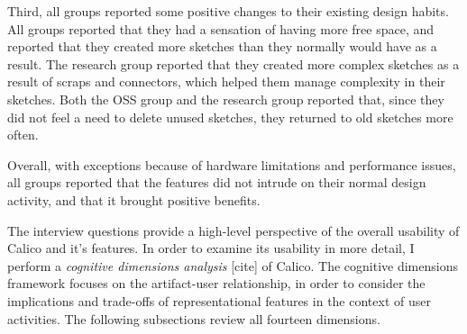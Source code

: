 
Third, all groups reported some positive changes to their existing design habits. All groups reported that they had a sensation of having more free space, and reported that they created more sketches than they normally would have as a result. The research group reported that they created more complex sketches as a result of scraps and connectors, which helped them manage complexity in their sketches. Both the OSS group and the research group reported that, since they did not feel a need to delete unused sketches, they returned to old sketches more often.



Overall, with exceptions because of hardware limitations and performance issues, all groups reported that the features did not intrude on their normal design activity, and that it brought positive benefits. 

The interview questions provide a high-level perspective of the overall usability of Calico and it's features. In order to examine its usability in more detail, I perform a \textit{cognitive dimensions analysis} [cite] of Calico. The cognitive dimensions framework focuses on the artifact-user relationship, in order to consider the implications and trade-offs of representational features in the context of user activities. The following subsections review all fourteen dimensions.


